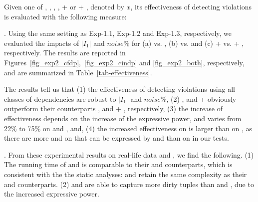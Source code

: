 \eat{%
\begin{figure}[tb!]
  \centering
  \subfigure[Varying $I_{1}|$ for \hosp]{\epsfig{file=exp-fig/23a.eps}}  %
  \quad
  \subfigure[Varying $noise\%$ for \hosp]{\epsfig{file=exp-fig/23b.eps}}
  \quad
  \subfigure[Varying $I_{1}|$ for \dblp]{\epsfig{file=exp-fig/23c.eps}}
  \quad
  \subfigure[Varying $noise\%$ for \dblp]{\epsfig{file=exp-fig/23d.eps}}
  \caption{Effectiveness of detecting \pCFD and \pCIND violations}\label{fig_exp2_both}
\end{figure}
}

Given one of \CFDs, \pCFDs, \CINDs, \pCINDs,  \CFDs + \CINDs or \pCFDs + \pCINDs, denoted by $x$, its effectiveness of detecting violations is evaluated with the following measure:

\vspace{0ex}




. Using the same setting as {Exp-1.1}, {Exp-1.2} and {Exp-1.3}, respectively, we evaluated the impacts of $|I_1|$ and $noise\%$ for
(a) {\pCFDs vs. \CFDs}, (b) {\pCINDs vs. \CINDs} and (c) {\pCFDs + \pCINDs vs. \CFDs + \CINDs}, respectively.
%
The results are reported in Figures~\ref{fig_exp2_cfdp},~\ref{fig_exp2_cindp} and \ref{fig_exp2_both}, respectively, and are summarized in Table~\ref{tab-effectiveness}.

The results tell us that (1) the effectiveness of detecting violations using all classes of dependencies are robust to $|I_1|$ and $noise\%$,
%
(2) \pCFDs, \pCINDs and \pCFDs + \pCINDs obviously outperform their counterparts \CFDs, \CINDs and \CFDs + \CINDs, respectively,
%
(3) the increase of effectiveness depends on the increase of the expressive power, and varies from 22\% to 75\% on \hosp and \dblp,  and,
%
(4) the increased effectiveness on \dblp is larger than on \hosp, as there are more \pCFDs and \pCINDs on \hosp that can be expressed by \CFDs and \CINDs than on \dblp in our tests.



. From these experimental results on real-life data \hosp and \dblp, we find the following.
(1) The running time of \pCFDs and \pCINDs is comparable to their \CFDs and \CINDs counterparts, which is consistent with the
the static analyses:  \pCFDs and \pCINDs retain the same complexity
as their \CFDs and \CINDs counterparts.
(2) \pCFDs and \pCINDs are able to capture more dirty tuples than \CFDs and \CINDs, due to the increased expressive power.





